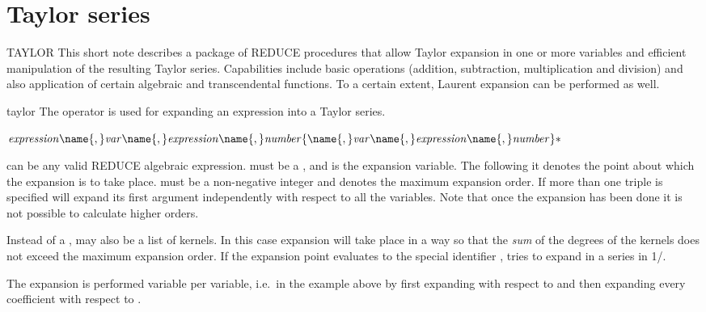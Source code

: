\section{Taylor series}

\begin{Introduction}{TAYLOR}
This short note describes a package of REDUCE procedures that allow
Taylor expansion in one or more variables and efficient manipulation
of the resulting Taylor series. Capabilities include basic operations
(addition, subtraction, multiplication and division) and also
application of certain algebraic and transcendental functions. To a
certain extent, Laurent expansion can be performed as well.
\end{Introduction}

\begin{Operator}{taylor}
  The  operator is used for expanding an expression into a
  Taylor series.

  \begin{Syntax}
    \(\meta{expression}
                   \name{,}\meta{var}\name{,}
                   \meta{expression}\name{,}\meta{number}\\
                   \{\name{,}\meta{var}\name{,}
                   \meta{expression}\name{,}\meta{number}\}\optional\)
  \end{Syntax}
   can be any valid REDUCE algebraic expression.
   must be a , and is the expansion
  variable.  The  following it denotes the point
  about which the expansion is to take place.  must be a
  non-negative integer and denotes the maximum expansion order.  If
  more than one triple is specified  will expand its
  first argument independently with respect to all the variables.
  Note that once the expansion has been done it is not possible to
  calculate higher orders.

  Instead of a ,  may also be a list of
  kernels.  In this case expansion will take place in a way so that
  the {\em sum\/} of the degrees of the kernels does not exceed the
  maximum expansion order.  If the expansion point evaluates to the
  special identifier ,  tries to expand in
  a series in 1/.

  The expansion is performed variable per variable, i.e.\ in the
  example above by first expanding 
  with respect to
   and then expanding every coefficient with respect to .


\end{Operator}
